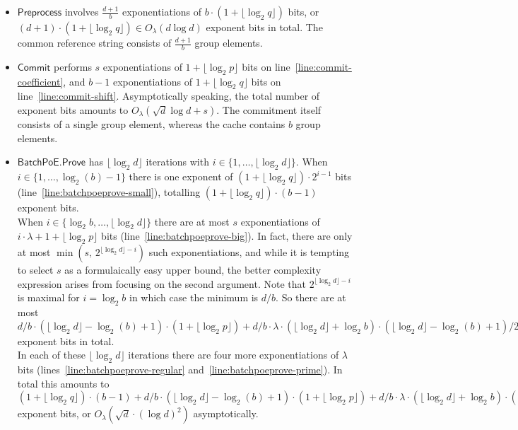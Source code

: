 \documentclass[10pt,conference]{IEEEtran}
\theoremstyle{Definition}
\begin{document}
\begin{itemize}
\item $\mathsf{Preprocess}$ involves $\frac{d+1}{b}$ exponentiations of $b \cdot (1 + \lfloor \log_2 q \rfloor)$ bits, or $(d+1) \cdot (1 + \lfloor \log_2 q \rfloor) \in O_\lambda(d \log d)$ exponent bits in total. The common reference string consists of $\frac{d+1}{b}$ group elements.
\item $\mathsf{Commit}$ performs $s$ exponentiations of $1+\lfloor \log_2 p \rfloor$ bits on line~\ref{line:commit-coefficient}, and $b-1$ exponentiations of $1+\lfloor \log_2 q \rfloor$ bits on line~\ref{line:commit-shift}. Asymptotically speaking, the total number of exponent bits amounts to $O_\lambda(\sqrt{d} \log d + s)$. The commitment itself consists of a single group element, whereas the cache contains $b$ group elements.
\item $\mathsf{BatchPoE.Prove}$ has $\lfloor \log_2 d \rfloor$ iterations with $i \in \{1, \ldots, \lfloor \log_2 d \rfloor\}$. When $i \in \{1, \ldots, \log_2(b)-1\}$ there is one exponent of $(1 + \lfloor \log_2 q \rfloor) \cdot {2^{i-1}}$ bits (line~\ref{line:batchpoeprove-small}), totalling $(1+\lfloor \log_2 q \rfloor) \cdot (b-1)$ exponent bits. \\
When $i \in \{\log_2 b, \ldots, \lfloor \log_2 d \rfloor\}$ there are at most $s$ exponentiations of $i \cdot \lambda + 1 + \lfloor \log_2 p \rfloor$ bits (line~\ref{line:batchpoeprove-big}). In fact, there are only at most $\min(s, \, 2^{\lfloor \log_2 d \rfloor - i})$ such exponentiations, and while it is tempting to select $s$ as a formulaically easy upper bound, the better complexity expression arises from focusing on the second argument. Note that $2^{\lfloor \log_2 d \rfloor - i}$ is maximal for $i = \log_2 b$ in which case the minimum is $d/b$. So there are at most $d/b \cdot (\lfloor \log_2 d \rfloor - \log_2(b) + 1) \cdot (1 + \lfloor \log_2 p \rfloor) + d/b \cdot \lambda \cdot (\lfloor \log_2 d \rfloor + \log_2 b) \cdot (\lfloor \log_2 d \rfloor - \log_2(b) + 1)/2$ exponent bits in total. \\
In each of these $\lfloor \log_2 d \rfloor$ iterations there are four more exponentiations of $\lambda$ bits (lines~\ref{line:batchpoeprove-regular} and~\ref{line:batchpoeprove-prime}). In total this amounts to $(1+\lfloor \log_2 q \rfloor) \cdot (b-1)  +  d/b \cdot (\lfloor \log_2 d \rfloor - \log_2(b) + 1) \cdot (1 + \lfloor \log_2 p \rfloor) + d/b \cdot \lambda \cdot (\lfloor \log_2 d \rfloor + \log_2 b) \cdot (\lfloor \log_2 d \rfloor - \log_2(b) + 1)/2  +  4 \cdot \lambda \cdot \lfloor \log_2 d \rfloor$ exponent bits, or $O_\lambda(\sqrt{d} \cdot (\log d)^2)$ asymptotically.

\end{itemize}
\end{document}
